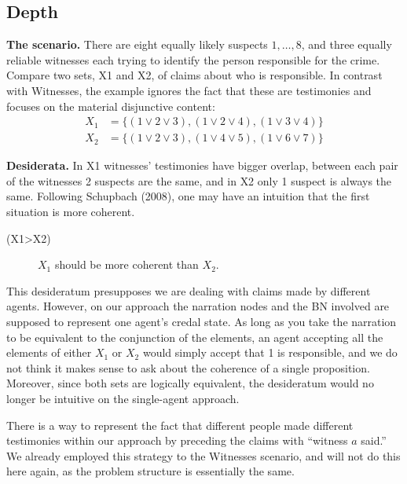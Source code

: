 \documentclass[
  10pt,
]{scrartcl}
\newcommand{\s}[1]{\textsf{#1}}
\begin{document}
\hypertarget{depth}{%
\subsection{Depth}\label{depth}}

\textbf{The scenario.} There are eight equally likely suspects \(1, \dots, 8\), and three equally reliable witnesses each trying to identify the person responsible for the crime. Compare two sets, \s{X1} and \s{X2}, of claims about who is responsible. In contrast with Witnesses, the example ignores the fact that these are testimonies and focuses on the material disjunctive content:
\begin{align*}
    X_1 & = \{(1 \vee 2 \vee 3), (1\vee 2 \vee 4), (1 \vee 3 \vee 4)\}\\
    X_2 & =  \{(1 \vee 2 \vee 3), (1\vee  4 \vee 5), (1 \vee 6 \vee 7)\}
\end{align*}

\noindent \textbf{Desiderata.} In \s{X1} witnesses' testimonies have bigger overlap, between each pair of the witnesses 2 suspects are the same, and in \s{X2} only 1 suspect is always the same. Following Schupbach (2008), one may have an intuition that the first situation is more coherent.
\vspace{2mm}

\begin{description}
    \item[(\s{X1\textgreater X2})] $X_1$  should be more coherent than $X_2$.
\end{description}\vspace{2mm}

This desideratum presupposes we are dealing with claims made by different agents. However, on our approach the narration nodes and the BN involved are supposed to represent one agent's credal state. As long as you take the narration to be equivalent to the conjunction of the elements, an agent accepting all the elements of either \(X_1\) or \(X_2\) would simply accept that 1 is responsible, and we do not think it makes sense to ask about the coherence of a single proposition. Moreover, since both sets are logically equivalent, the desideratum would no longer be intuitive on the single-agent approach.

There is a way to represent the fact that different people made different testimonies within our approach by preceding the claims with ``witness \(a\) said.'' We already employed this strategy to the Witnesses scenario, and will not do this here again, as the problem structure is essentially the same.
\end{document}
